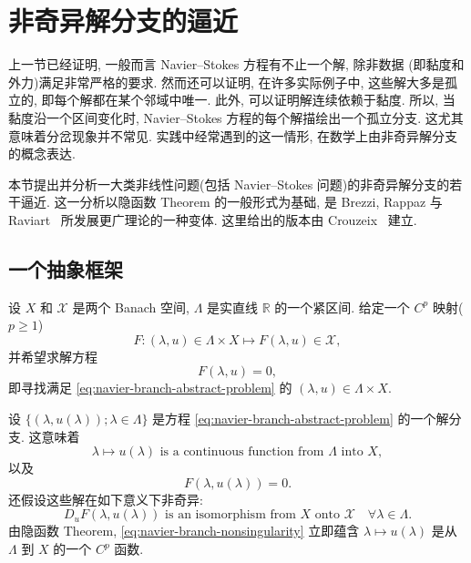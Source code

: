 \section{非奇异解分支的逼近}
\label{sec:navier-nonsingular-branches}
\setcounter{equation}{0}

上一节已经证明, 一般而言 Navier--Stokes 方程有不止一个解, 除非数据
(即黏度和外力)满足非常严格的要求. 然而还可以证明, 在许多实际例子中,
这些解大多是孤立的, 即每个解都在某个邻域中唯一. 此外, 可以证明解连续依赖于黏度.
所以, 当黏度沿一个区间变化时, Navier--Stokes 方程的每个解描绘出一个孤立分支.
这尤其意味着分岔现象并不常见. 实践中经常遇到的这一情形, 在数学上由非奇异解分支的概念表达.

本节提出并分析一大类非线性问题(包括 Navier--Stokes 问题)的非奇异解分支的若干逼近.
这一分析以隐函数 Theorem 的一般形式为基础, 是 Brezzi, Rappaz 与
Raviart~\cite{BrezziRappazRaviart1980} 所发展更广理论的一种变体.
这里给出的版本由 Crouzeix~\cite{CrouzeixForthcoming} 建立.

\subsection{一个抽象框架}
\label{subsec:navier-nonsingular-abstract}

设 $X$ 和 $\mathscr X$ 是两个 Banach 空间, $\Lambda$ 是实直线
$\mathbb R$ 的一个紧区间. 给定一个 $C^p$ 映射($p\geq1$)
\[
F:(\lambda,u)\in\Lambda\times X
\longmapsto F(\lambda,u)\in\mathscr X,
\]
并希望求解方程
\begin{equation}\label{eq:navier-branch-abstract-problem}
F(\lambda,u)=0,
\end{equation}
即寻找满足 \eqref{eq:navier-branch-abstract-problem} 的
$(\lambda,u)\in\Lambda\times X$.

设 $\{(\lambda,u(\lambda));\lambda\in\Lambda\}$ 是方程
\eqref{eq:navier-branch-abstract-problem} 的一个解分支. 这意味着
\begin{equation}\label{eq:navier-branch-continuity}
\lambda\longmapsto u(\lambda)
\text{ is a continuous function from }\Lambda\text{ into }X,
\end{equation}
以及
\begin{equation}\label{eq:navier-branch-solution-identity}
F(\lambda,u(\lambda))=0.
\end{equation}
还假设这些解在如下意义下非奇异:
\begin{equation}\label{eq:navier-branch-nonsingularity}
D_uF(\lambda,u(\lambda))
\text{ is an isomorphism from }X\text{ onto }\mathscr X
\quad\forall\lambda\in\Lambda.
\end{equation}
由隐函数 Theorem, \eqref{eq:navier-branch-nonsingularity} 立即蕴含
$\lambda\mapsto u(\lambda)$ 是从 $\Lambda$ 到 $X$ 的一个 $C^p$ 函数.


